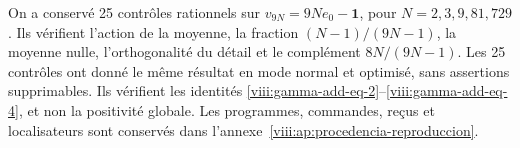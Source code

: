 On a conservé 25 contrôles rationnels sur \(v_{9N}=9Ne_0-\mathbf1\), pour \(N=2,3,9,81,729\). Ils vérifient l'action de la moyenne, la fraction \((N-1)/(9N-1)\), la moyenne nulle, l'orthogonalité du détail et le complément \(8N/(9N-1)\). Les 25 contrôles ont donné le même résultat en mode normal et optimisé, sans assertions supprimables. Ils vérifient les identités \eqref{viii:gamma-add-eq-2}--\eqref{viii:gamma-add-eq-4}, et non la positivité globale. Les programmes, commandes, reçus et localisateurs sont conservés dans l'annexe~\ref{viii:ap:procedencia-reproduccion}.

